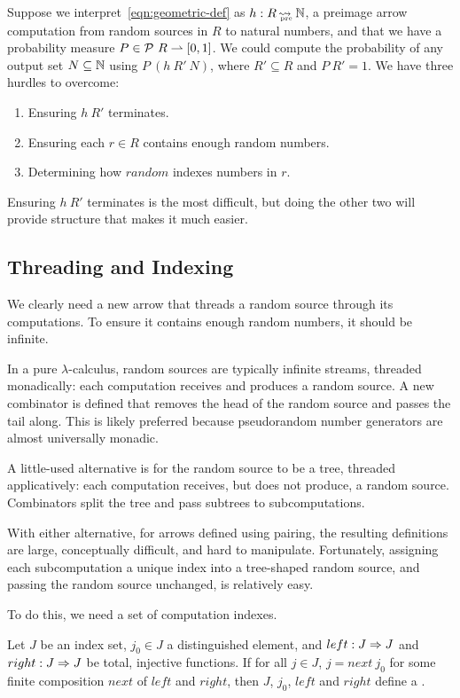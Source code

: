 \documentclass{llncs}
\newcommand{\arrow}{\rightsquigarrow}
\newcommand{\pto}{\rightharpoonup}
\newcommand{\pre}{_\mathrm{pre}}
\DeclareMathOperator{\preto}{\arrow_{\mspace{-19mu}\pre}}
\begin{document}
Suppose we interpret~\eqref{eqn:geometric-def} as $h : R \preto \Nat$, a preimage arrow computation from random sources in $R$ to natural numbers, and that we have a probability measure $P \in \powerset~R \pto [0,1]$.
We could compute the probability of any output set $N \subseteq \mathbb{N}$ using $P~(h~R'~N)$, where $R' \subseteq R$ and $P~R' = 1$. We have three hurdles to overcome:
\begin{enumerate}
	\item Ensuring $h~R'$ terminates.
	\item Ensuring each $r \in R$ contains enough random numbers.
	\item Determining how $random$ indexes numbers in $r$.
\end{enumerate}
Ensuring $h~R'$ terminates is the most difficult, but doing the other two will provide structure that makes it much easier.

\subsection{Threading and Indexing}

We clearly need a new arrow that threads a random source through its computations.
To ensure it contains enough random numbers, it should be infinite.

In a pure $\lambda$-calculus, random sources are typically infinite streams, threaded monadically: each computation receives and produces a random source.
A new combinator is defined that removes the head of the random source and passes the tail along.
This is likely preferred because pseudorandom number generators are almost universally monadic.

A little-used alternative is for the random source to be a tree, threaded applicatively:
each computation receives, but does not produce, a random source.
Combinators split the tree and pass subtrees to subcomputations.

With either alternative, for arrows defined using pairing, the resulting definitions are large, conceptually difficult, and hard to manipulate.
Fortunately, assigning each subcomputation a unique index into a tree-shaped random source, and passing the random source unchanged, is relatively easy.

To do this, we need a set of computation indexes.

\begin{definition}
Let $J$ be an index set, $j_0 \in J$ a distinguished element, and $left : J \Rightarrow J$ and $right : J \Rightarrow J$ be total, injective functions. If for all $j \in J$, $j = next~j_0$ for some finite composition $next$ of $left$ and $right$, then $J$, $j_0$, $left$ and $right$ define a .
\end{definition}
\end{document}
